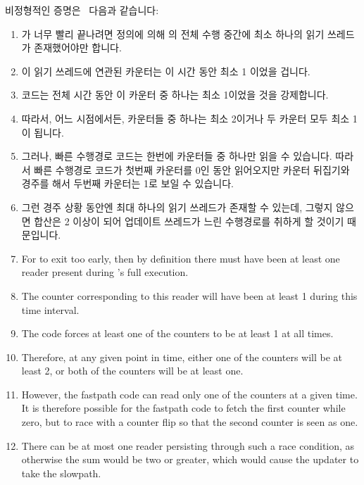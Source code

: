 비정형적인 증명은~\cite{PaulMcKenney2007QRCUpatch} 다음과 같습니다:

\iffalse

An informal proof~\cite{PaulMcKenney2007QRCUpatch}
follows:

\fi

\begin{enumerate}
\item	{} 가 너무 빨리 끝나려면 정의에 의해
	 의 전체 수행 중간에 최소 하나의 읽기 쓰레드가
	존재했어야만 합니다.
\item	이 읽기 쓰레드에 연관된 카운터는 이 시간 동안 최소 1 이었을 겁니다.
\item	{} 코드는 전체 시간 동안 이 카운터 중 하나는 최소
	1이었을 것을 강제합니다.
\item	따라서, 어느 시점에서든, 카운터들 중 하나는 최소 2이거나 두 카운터 모두
	최소 1이 됩니다.
\item	그러나,  빠른 수행경로 코드는 한번에 카운터들 중
	하나만 읽을 수 있습니다.
	따라서 빠른 수행경로 코드가 첫번째 카운터를 0인 동안 읽어오지만 카운터
	뒤집기와 경주를 해서 두번째 카운터는 1로 보일 수 있습니다.
\item	그런 경주 상황 동안엔 최대 하나의 읽기 쓰레드가 존재할 수 있는데,
	그렇지 않으면 합산은 2 이상이 되어 업데이트 쓰레드가 느린 수행경로를
	취하게 할 것이기 때문입니다.

\iffalse

\item	For  to exit too early, then
	by definition there must have been at least one reader
	present during 's full
	execution.
\item	The counter corresponding to this reader will have been
	at least 1 during this time interval.
\item	The  code forces at least one
	of the counters to be at least 1 at all times.
\item	Therefore, at any given point in time, either one of the
	counters will be at least 2, or both of the counters will
	be at least one.
\item	However, the  fastpath code
	can read only one of the counters at a given time.
	It is therefore possible for the fastpath code to fetch
	the first counter while zero, but to race with a counter
	flip so that the second counter is seen as one.
\item	There can be at most one reader persisting through such
	a race condition, as otherwise the sum would be two or
	greater, which would cause the updater to take the slowpath.


\end{enumerate}
